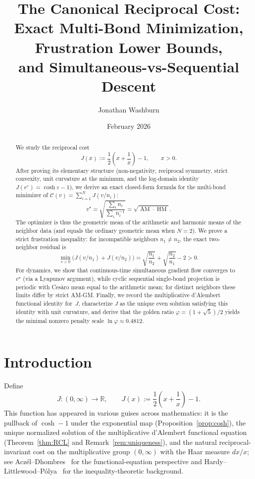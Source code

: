 \documentclass[11pt]{amsart}
\title[The Canonical Reciprocal Cost]{The Canonical Reciprocal Cost:\\
Exact Multi-Bond Minimization, Frustration Lower Bounds,\\
and Simultaneous-vs-Sequential Descent}
\author{Jonathan Washburn}
\date{February 2026}
\theoremstyle{definition}
\theoremstyle{remark}
\newcommand{\R}{\mathbb{R}}
\begin{document}
\begin{abstract}
We study the reciprocal cost
\[
J(x):=\frac12\!\left(x+\frac1x\right)-1,\qquad x>0.
\]
After proving its elementary structure (non-negativity, reciprocal
symmetry, strict convexity, unit curvature at the minimum, and the
log-domain identity $J(e^\varepsilon)=\cosh\varepsilon-1$), we derive an
exact closed-form formula for the multi-bond minimizer of
$\mathcal C(v)=\sum_{i=1}^N J(v/n_i)$:
\[
v^\star=\sqrt{\frac{\sum_i n_i}{\sum_i n_i^{-1}}}
=\sqrt{\operatorname{AM}\cdot\operatorname{HM}}.
\]
The optimizer is thus the geometric mean of the arithmetic and harmonic
means of the neighbor data (and equals the ordinary geometric mean when $N=2$).
We prove a strict frustration inequality: for incompatible neighbors
$n_1\neq n_2$, the exact two-neighbor residual is
\[
\min_{v>0}\bigl(J(v/n_1)+J(v/n_2)\bigr)
=\sqrt{\frac{n_1}{n_2}}+\sqrt{\frac{n_2}{n_1}}-2>0.
\]
For dynamics, we show that continuous-time simultaneous gradient flow
converges to $v^\star$ (via a Lyapunov argument), while cyclic sequential
single-bond projection is periodic with Ces\`aro mean equal to the
arithmetic mean; for distinct neighbors these limits differ by strict AM-GM.
Finally, we record the multiplicative d'Alembert functional identity for~$J$,
characterize $J$ as the unique even solution satisfying this identity with
unit curvature, and derive that the golden ratio $\varphi=(1+\sqrt5)/2$
yields the minimal nonzero penalty scale $\ln\varphi\approx 0.4812$.
\end{abstract}

\maketitle

\section{Introduction}\label{sec:intro}

Define
\begin{equation}\label{eq:J-def}
J:(0,\infty)\to\R,\qquad
J(x):=\frac12\!\left(x+\frac1x\right)-1.
\end{equation}
This function has appeared in various guises across mathematics:
it is the pullback of $\cosh-1$ under the exponential map (Proposition~\ref{prop:cosh}),
the unique normalized solution of the multiplicative d'Alembert functional
equation (Theorem~\ref{thm:RCL} and Remark~\ref{rem:uniqueness}),
and the natural reciprocal-invariant cost on the multiplicative group
$(0,\infty)$ with the Haar measure $dx/x$; see Acz\'el--Dhombres~\cite{AczelDhombres}
for the functional-equation perspective and
Hardy--Littlewood--P\'olya~\cite{HardyLittlewoodPolya} for the
inequality-theoretic background.
\end{document}
